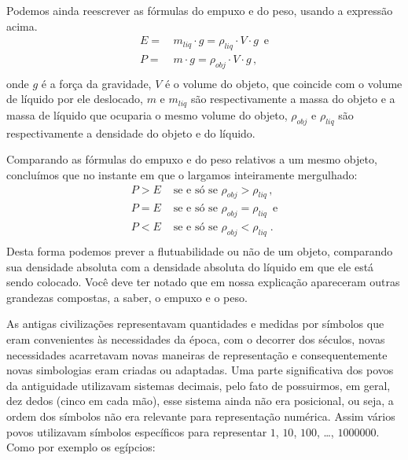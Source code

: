 Podemos  ainda reescrever as fórmulas do empuxo e do peso, usando a expressão acima.
\begin{equation*}
\begin{split}E = & \, m_{liq} \cdot g = \rho_{liq} \cdot V \cdot g \,\,\, \text{e} \\
P = & \, m \cdot g = \rho_{obj} \cdot V \cdot g \, \text{,}\\\end{split}
\end{equation*}
onde $g$ é a força da gravidade,  $V$ é o volume do objeto, que coincide com o volume de líquido por ele deslocado, $m$ e $m_{liq}$  são respectivamente a massa do objeto e a massa de líquido que ocuparia o mesmo volume do objeto, $\rho_{obj}$  e $\rho_{liq}$ são respectivamente  a densidade  do objeto e do líquido.

Comparando as fórmulas do empuxo e do peso relativos a um mesmo objeto, concluímos que no instante em que o largamos inteiramente mergulhado:
\begin{equation*}
\begin{split}P > E & \,\, \text{se e só se} \,\, \rho_{obj} > \rho_{liq} \, \text{,} \\
P = E & \,\, \text{se e só se}  \,\, \rho_{obj} = \rho_{liq} \,\,\, \text{e} \\
P < E & \,\, \text{se e só se} \,\, \rho_{obj} < \rho_{liq} \;\text{.}\\\end{split}
\end{equation*}
Desta forma podemos prever a flutuabilidade ou não de um objeto, comparando sua densidade absoluta com a densidade absoluta do líquido em que ele está sendo colocado. Você deve ter notado que em nossa explicação apareceram outras grandezas compostas, a saber, o empuxo e o peso.


\label{\detokenize{NO103-3::doc}}\label{\detokenize{NO103-3:explorando-representacao-conceito-numerico-e-precisao}}

As antigas civilizações representavam quantidades e medidas por símbolos que eram convenientes às necessidades da época, com o decorrer dos séculos, novas necessidades acarretavam novas maneiras de representação  e consequentemente novas simbologias eram criadas ou adaptadas. Uma parte significativa dos povos da antiguidade utilizavam sistemas decimais, pelo fato de possuirmos, em geral, dez dedos (cinco em cada mão), esse sistema ainda não era posicional, ou seja, a ordem dos símbolos não era relevante para representação numérica. Assim vários povos utilizavam símbolos específicos para representar $1$, $10$, $100$, …, $1 000 000$. Como por exemplo os egípcios:

